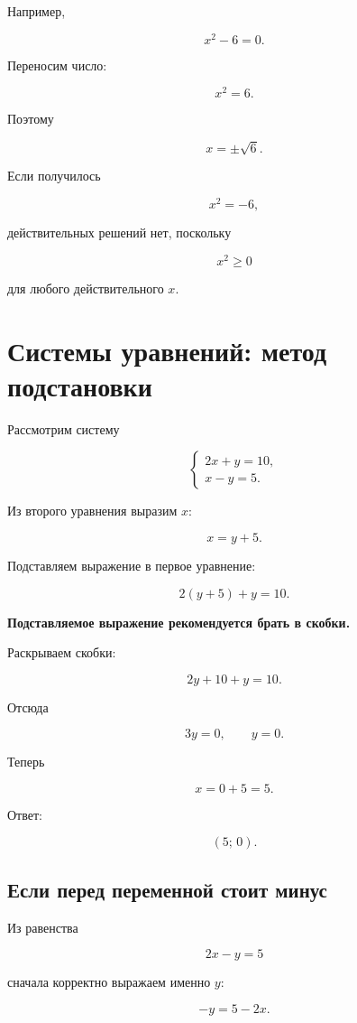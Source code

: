 \documentclass[a4paper,12pt]{article}
\newcommand{\important}[1]{\textbf{\color{darkaccent}#1}}
\begin{document}
Например,

\[
x^2-6=0.
\]

Переносим число:

\[
x^2=6.
\]

Поэтому

\[
x=\pm\sqrt6.
\]

Если получилось

\[
x^2=-6,
\]

действительных решений нет, поскольку

\[
x^2\ge0
\]

для любого действительного \(x\).

\section{Системы уравнений: метод подстановки}

Рассмотрим систему

\[
\begin{cases}
2x+y=10,\\
x-y=5.
\end{cases}
\]

Из второго уравнения выразим \(x\):

\[
x=y+5.
\]

Подставляем выражение в первое уравнение:

\[
2(y+5)+y=10.
\]

\important{Подставляемое выражение рекомендуется брать в скобки.}

Раскрываем скобки:

\[
2y+10+y=10.
\]

Отсюда

\[
3y=0,
\qquad
y=0.
\]

Теперь

\[
x=0+5=5.
\]

Ответ:

\[
\boxed{(5;\,0)}.
\]

\subsection{Если перед переменной стоит минус}

Из равенства

\[
2x-y=5
\]

сначала корректно выражаем именно \(y\):

\[
-y=5-2x.
\]
\end{document}
